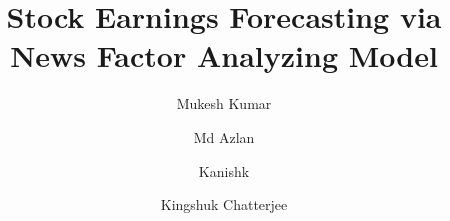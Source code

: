 \documentclass[3p,times,procedia]{elsarticle}
\begin{document}
\begin{frontmatter}




\title{Stock Earnings Forecasting via News Factor
Analyzing Model}




\author[a]{Mukesh Kumar}
\author[b]{Md Azlan}
\author[c]{Kanishk}
\author[d]{Kingshuk Chatterjee}

\address[a]{School of Computer Engineering,Kalinga Institute of Industrial Technology-751024}
\address[b]{School of Computer Engineering,Kalinga Institute of Industrial Technology-751024}
\address[c]{School of Computer Engineering,Kalinga Institute of Industrial Technology-751024}
\address[d]{School of Computer Engineering,Kalinga Institute of Industrial Technology-751024}




\end{frontmatter}
\end{document}
